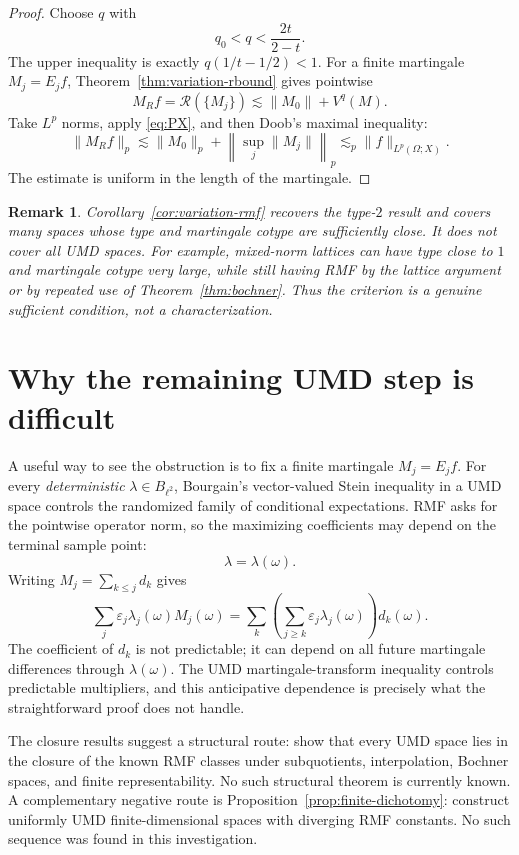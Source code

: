 \documentclass[11pt]{article}
\newtheorem{remark}[theorem]{Remark}
\theoremstyle{definition}
\newcommand{\cR}{\mathcal R}
\newcommand{\1}{\mathbf 1}
\newcommand{\eps}{\varepsilon}
\begin{document}
\begin{proof}
Choose $q$ with
\[
 q_0<q<\frac{2t}{2-t}.
\]
The upper inequality is exactly
$q(1/t-1/2)<1$.  For a finite martingale
$M_j=E_jf$, Theorem~\ref{thm:variation-rbound} gives pointwise
\[
 M_Rf=\cR(\{M_j\})\lesssim \|M_0\|+V^q(M).
\]
Take $L^p$ norms, apply \eqref{eq:PX}, and then Doob's maximal inequality:
\[
 \|M_Rf\|_p
 \lesssim \|M_0\|_p+
 \left\|\sup_j\|M_j\|\right\|_p
 \lesssim_p \|f\|_{L^p(\Omega;X)}.
\]
The estimate is uniform in the length of the martingale.
\end{proof}

\begin{remark}
Corollary~\ref{cor:variation-rmf} recovers the type-$2$ result and covers many
spaces whose type and martingale cotype are sufficiently close.  It does not
cover all UMD spaces.  For example, mixed-norm lattices can have type close to
$1$ and martingale cotype very large, while still having RMF by the lattice
argument or by repeated use of Theorem~\ref{thm:bochner}.  Thus the criterion is
a genuine sufficient condition, not a characterization.
\end{remark}

\section{Why the remaining UMD step is difficult}

A useful way to see the obstruction is to fix a finite martingale
$M_j=E_jf$.  For every \emph{deterministic} $\lambda\in B_{\ell^2}$, Bourgain's
vector-valued Stein inequality in a UMD space controls the randomized family of
conditional expectations.  RMF asks for the pointwise operator norm, so the
maximizing coefficients may depend on the terminal sample point:
\[
 \lambda=\lambda(\omega).
\]
Writing $M_j=\sum_{k\le j}d_k$ gives
\[
 \sum_j\eps_j\lambda_j(\omega)M_j(\omega)
 =\sum_k\left(\sum_{j\ge k}\eps_j\lambda_j(\omega)\right)d_k(\omega).
\]
The coefficient of $d_k$ is not predictable; it can depend on all future
martingale differences through $\lambda(\omega)$.  The UMD martingale-transform
inequality controls predictable multipliers, and this anticipative dependence is
precisely what the straightforward proof does not handle.

The closure results suggest a structural route: show that every UMD space lies
in the closure of the known RMF classes under subquotients, interpolation,
Bochner spaces, and finite representability.  No such structural theorem is
currently known.  A complementary negative route is
Proposition~\ref{prop:finite-dichotomy}: construct uniformly UMD
finite-dimensional spaces with diverging RMF constants.  No such sequence
was found in this investigation.
\end{document}

